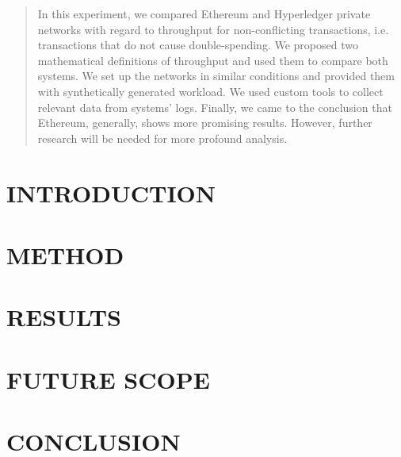 \documentclass[12pt]{article}
\begin{document}

\tableofcontents
\pagebreak


\begin{abstract}
In this experiment, we compared Ethereum and Hyperledger private networks with regard to throughput for non-conflicting transactions, i.e. transactions that do not cause double-spending. We proposed two mathematical definitions of throughput and used them to compare both systems. We set up the networks in similar conditions and provided them with synthetically generated workload. We used custom tools to collect relevant data from systems’ logs. Finally, we came to the conclusion that Ethereum, generally, shows more promising results. However, further research will be needed for more profound analysis.
\end{abstract}

\newpage
\section{INTRODUCTION}

\section{METHOD}

\section{RESULTS}

\section{FUTURE SCOPE}

\section{CONCLUSION}


\newpage


\end{document}
